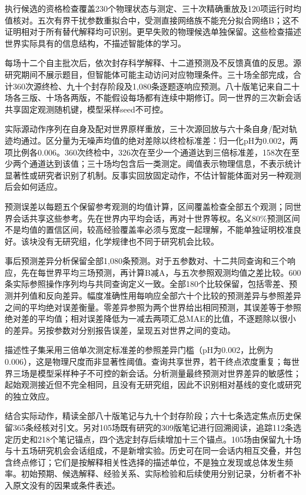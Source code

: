 \documentclass[10pt,a4paper]{article}
\begin{document}
执行候选的资格检查覆盖230个物理状态与测定、三十次精确重放及120项运行时均值核对。五次有界干扰参数重拟合中，受测直接网络族不能充分拟合网络B；这不证明相对于所有替代解释均可识别。更早失败的物理候选单独保留。这些检查描述世界实际具有的信息结构，不描述智能体的学习。

每场十二个自主批次后，依次封存科学解释、十二道预测及不反馈真值的反思。源研究期间不展示题目，但智能体可能主动访问对应物理条件。三十场全部完成，合计360次源终检、九十个封存阶段及1,080条逐题逐响应预测。八十版笔记来自二十场各三版、十场各两版，不能假设每场都有连续中期修订。同一世界的三次新会话共享固定观测随机键，模型采样seed不可控。

实际源动作序列在自身及配对世界原样重放，三十次源回放与六十条自身/配对轨迹均通过。区分量为无噪声均值的绝对差除以终检标准差：归一化pH为0.002，两项比例各0.006。360次终检中，326次在至少一个通道达到三倍标准差，158次在至少两个通道达到该值；三十场均包含后一类测定。阈值表示物理信息，不表示统计显著性或研究者识别了机制。反事实回放固定动作，不估计智能体面对另一种观测后会如何适应。

预测误差以每题五个保留参考观测的均值计算，区间覆盖检查全部五个观测；同世界会话共享这些参考。先在世界内平均会话，再对十世界等权。名义80\%预测区间不是均值的置信区间，较高经验覆盖率必须与宽度一起理解，不能单独证明校准良好。该块没有无研究组，化学规律也不同于研究机会比较。

事后预测差异分析保留全部1,080条预测。对于五参数对、十二共同查询和三个响应，先在每世界平均三场预测，再计算B减A，与五次参照观测均值之差比较。600条实际参照操作序列均与共同查询定义一致。全部180个比较保留，包括零差、预测并列值和反向差异。幅度准确性用每响应全部六十个比较的预测差异与参照差异之间的平均绝对误差衡量。零差异参照为两个世界给出相同预测，其误差等于参照绝对差的平均值；相对误差降低为一减去两项汇总MAE的比值，不逐题除以很小的差异。另按参数对分别报告误差，呈现五对世界之间的变动。

描述性子集采用三倍单次测定标准差的参照差异门槛（pH为0.002，比例为0.006），这是物理尺度而非显著性阈值。查询共享世界，若干终点浓度重复；每世界三场是模型采样种子不可控的新会话。分析测量最终预测对世界差异的敏感性；起始观测接近但不完全相同，且没有无研究组，因此不识别相对基线的变化或研究的独立效应。

结合实际动作，精读全部八十版笔记与九十个封存阶段；六十七条选定焦点历史保留365条经核对引文。另对105场既有研究的309版笔记进行回溯阅读，追踪112条选定历史和218个笔记锚点，四个选定封存后续增加十三个锚点。105场由保留九十场与十五场研究机会会话组成，不是新增实验。历史可在同一会话内相互交叠，并包含终点修订；它们是按解释相关性选择的描述单位，不是独立发现或总体发生频率。初始预期、候选解释、经验关系、实际检验和后续使用分别记录，分析者不补入原文没有的因果或条件表述。
\end{document}

